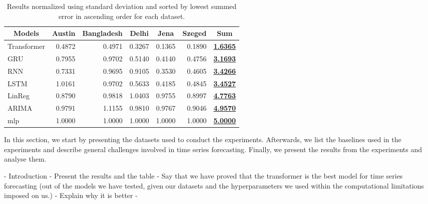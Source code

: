 \begin{table*}[t]
    \centering
    \caption {Results normalized using standard deviation and sorted by lowest summed error in ascending order for each dataset.} \label{tab:ResultsTableSummed} 
    \begin{tabular}{|l|r|r|r|r|r|r|}
    \hline
        \multicolumn{1}{|c|}{Models} & \multicolumn{1}{c|}{Austin} & \multicolumn{1}{c|}{Bangladesh} & \multicolumn{1}{c|}{Delhi} & \multicolumn{1}{c|}{Jena} & \multicolumn{1}{c|}{Szeged} & \multicolumn{1}{c|}{Sum} \\ \hline
        Transformer & 0.4872 & 0.4971 & 0.3267 & 0.1365 & 0.1890 & {\ul{\textbf{1.6365}}} \\ \hline
        GRU & 0.7955 & 0.9702 & 0.5140 & 0.4140 & 0.4756 & {\ul{\textbf{3.1693}}} \\ \hline
        RNN & 0.7331 & 0.9695 & 0.9105 & 0.3530 & 0.4605 & {\ul{\textbf{3.4266}}} \\ \hline
        LSTM & 1.0161 & 0.9702 & 0.5633 & 0.4185 & 0.4845 & {\ul{\textbf{3.4527}}} \\ \hline
        LinReg & 0.8790 & 0.9818 & 1.0403 & 0.9755 & 0.8997 & {\ul{\textbf{4.7763}}} \\ \hline
        ARIMA & 0.9791 & 1.1155 & 0.9810 & 0.9767 & 0.9046 & {\ul{\textbf{4.9570}}} \\ \hline
        mlp & 1.0000 & 1.0000 & 1.0000 & 1.0000 & 1.0000 & {\ul{\textbf{5.0000}}} \\ \hline
    \end{tabular}
\end{table*}

In this section, we start by presenting the datasets used to conduct the experiments.
Afterwards, we list the baselines used in the experiments and describe general challenges involved in time series forecasting.
Finally, we present the results from the experiments and analyse them.

- Introduction 
- Present the results and the table
- Say that we have proved that the transformer is the best model for time series forecasting (out of the models we have tested, given our datasets and the hyperparameters we used within the computational limitations imposed on us.)
    - Explain why it is better 
    - 

    
